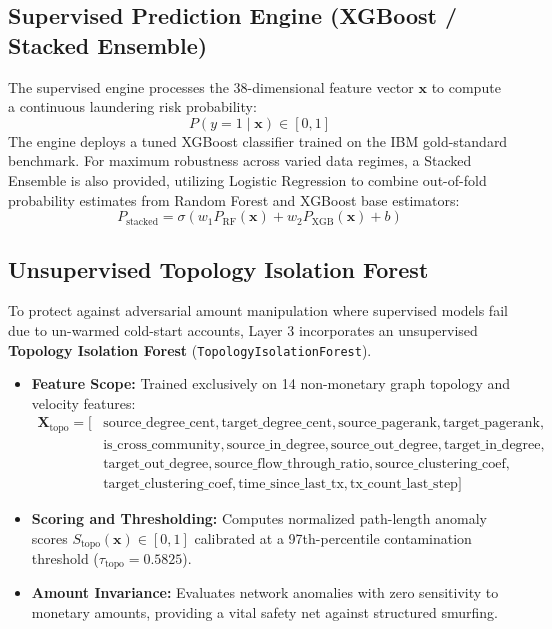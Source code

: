 \subsection{Supervised Prediction Engine (XGBoost / Stacked Ensemble)}
The supervised engine processes the 38-dimensional feature vector $\mathbf{x}$ to compute a continuous laundering risk probability:
\begin{equation}
    P(y=1 \mid \mathbf{x}) \in [0, 1]
\end{equation}
The engine deploys a tuned XGBoost classifier trained on the IBM gold-standard benchmark. For maximum robustness across varied data regimes, a Stacked Ensemble is also provided, utilizing Logistic Regression to combine out-of-fold probability estimates from Random Forest and XGBoost base estimators:
\begin{equation}
    P_{\text{stacked}} = \sigma\left( w_1 P_{\text{RF}}(\mathbf{x}) + w_2 P_{\text{XGB}}(\mathbf{x}) + b \right)
\end{equation}

\subsection{Unsupervised Topology Isolation Forest}
To protect against adversarial amount manipulation where supervised models fail due to un-warmed cold-start accounts, Layer 3 incorporates an unsupervised \textbf{Topology Isolation Forest} (\texttt{TopologyIsolationForest}).
\begin{itemize}
    \item \textbf{Feature Scope:} Trained exclusively on 14 non-monetary graph topology and velocity features:
    \begin{align*}
        \mathbf{X}_{\text{topo}} = [&\text{source\_degree\_cent}, \text{target\_degree\_cent}, \text{source\_pagerank}, \text{target\_pagerank}, \\
        &\text{is\_cross\_community}, \text{source\_in\_degree}, \text{source\_out\_degree}, \text{target\_in\_degree}, \\
        &\text{target\_out\_degree}, \text{source\_flow\_through\_ratio}, \text{source\_clustering\_coef}, \\
        &\text{target\_clustering\_coef}, \text{time\_since\_last\_tx}, \text{tx\_count\_last\_step}]
    \end{align*}
    \item \textbf{Scoring and Thresholding:} Computes normalized path-length anomaly scores $S_{\text{topo}}(\mathbf{x}) \in [0, 1]$ calibrated at a 97th-percentile contamination threshold ($\tau_{\text{topo}} = 0.5825$).
    \item \textbf{Amount Invariance:} Evaluates network anomalies with zero sensitivity to monetary amounts, providing a vital safety net against structured smurfing.
\end{itemize}

